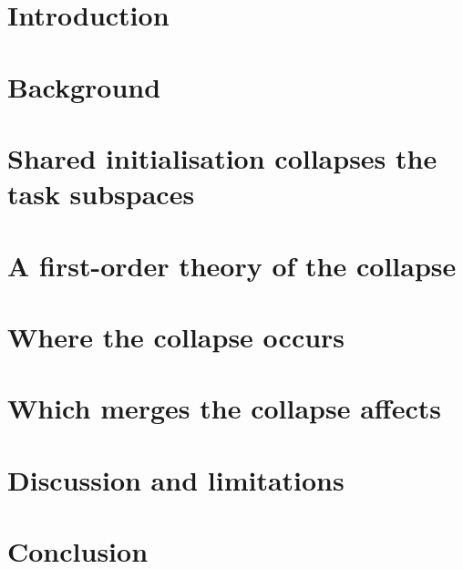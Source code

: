 \documentclass[a4paper,fleqn]{cas-sc}
\begin{document}
\maketitle

\section{Introduction}\label{sec:intro}


\section{Background}\label{sec:background}


\section{Shared initialisation collapses the task subspaces}\label{sec:collapse}


\section{A first-order theory of the collapse}\label{sec:theory}


\section{Where the collapse occurs}\label{sec:prevalence}


\section{Which merges the collapse affects}\label{sec:merging}


\section{Discussion and limitations}\label{sec:discussion}


\section{Conclusion}\label{sec:conclusion}


\printcredits


\end{document}
